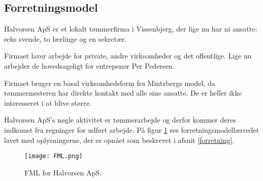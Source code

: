 \subsection{Forretningsmodel}

Halvorsen ApS er et lokalt tømmerfirma i Vissenbjerg, der lige nu har ni ansatte: seks svende, to lærlinge og en sekretær.

Firmaet laver arbejde for private, andre virksomheder og det offentlige.
Lige nu arbejder de hovedsageligt for entrepenør Per Pedersen.

Firmaet bruger en basal virksomhedsform fra Mintzbergs model, da tømmermesteren har direkte kontakt med alle sine ansatte. De er heller ikke interesseret i at blive større.\cite{organisation}

Halvorsen ApS's nøgle aktivitet er tømmerarbejde og derfor kommer deres indkomst fra regninger for udført arbejde.
På figur \ref{forretningsmodelfigur} ses forretningsmodellærredet lavet med oplysningerne, der er opnået som beskrevet i afsnit \ref{forretning}.

\begin{figure} 
    \caption{FML for Halvorsen ApS.}
    \centering
    \texttt{[image: FML.png]}
    \label{forretningsmodelfigur}
\end{figure}
